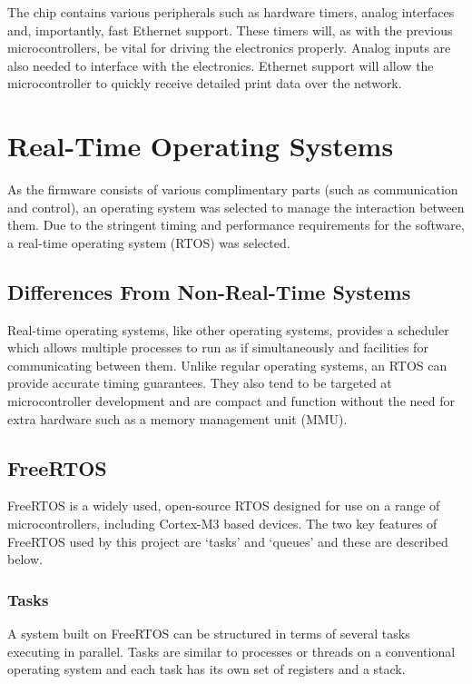 				The chip contains various peripherals such as hardware timers, analog
				interfaces and, importantly, fast Ethernet support. These timers will,
				as with the previous microcontrollers, be vital for driving the
				electronics properly. Analog inputs are also needed to interface with
				the electronics. Ethernet support will allow the microcontroller to
				quickly receive detailed print data over the network.
				
				
	\section{Real-Time Operating Systems}
		
		As the firmware consists of various complimentary parts (such as
		communication and control), an operating system was selected to manage the
		interaction between them. Due to the stringent timing and performance
		requirements for the software, a real-time operating system (RTOS) was
		selected.
		
		\subsection{Differences From Non-Real-Time Systems}
			
			Real-time operating systems, like other operating systems, provides a
			scheduler which allows multiple processes to run as if simultaneously and
			facilities for communicating between them. Unlike regular operating
			systems, an RTOS can provide accurate timing guarantees. They also tend to
			be targeted at microcontroller development and are compact and function
			without the need for extra hardware such as a memory management unit
			(MMU).
			
		\subsection{FreeRTOS}
			
			FreeRTOS is a widely used, open-source RTOS designed for use on a range of
			microcontrollers, including Cortex-M3 based devices. The two key features
			of FreeRTOS used by this project are `tasks' and `queues' and these are
			described below.
			
			\subsubsection{Tasks}
				
				A system built on FreeRTOS can be structured in terms of several tasks
				executing in parallel. Tasks are similar to processes or threads on a
				conventional operating system and each task has its own set of
				registers and a stack.
				
